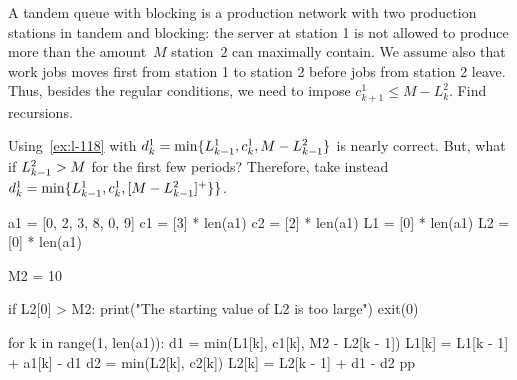 \documentclass[stochastic-or.tex]{subfiles}
\begin{document}
\begin{exercise}
A tandem queue with blocking is  a production network with two production stations in tandem and blocking: the server at station 1 is not allowed to produce more than the amount~$M$ station~$2$ can maximally contain.
We assume also that work jobs moves first from station 1 to station 2 before jobs from station 2 leave.
Thus, besides the regular conditions, we need to impose $c^1_{k+1} \leq M-L^2_k$.
Find recursions.

\begin{solution} Using~\cref{ex:l-118} with $d^1_k = \min\{L^1_{k-1}, c_k^1, M-L^2_{k-1}\}$ is nearly correct.
But, what if  $L^2_{k-1}>M$ for the first few periods? Therefore,  take instead
$d^1_k = \min\{L_{k-1}^1, c_k^1, [M-L^2_{k-1}]^+\}\}$.


\begin{python}
a1 = [0, 2, 3, 8, 0, 9]
c1 = [3] * len(a1)
c2 = [2] * len(a1)
L1 = [0] * len(a1)
L2 = [0] * len(a1)

M2 = 10

if L2[0] > M2:
    print("The starting value of L2 is too large")
    exit(0)

for k in range(1, len(a1)):
    d1 = min(L1[k], c1[k], M2 - L2[k - 1])
    L1[k] = L1[k - 1] + a1[k] - d1
    d2 = min(L2[k], c2[k])
    L2[k] = L2[k - 1] + d1 - d2
pp\end{python}

\end{solution}
\end{exercise}
\end{document}
